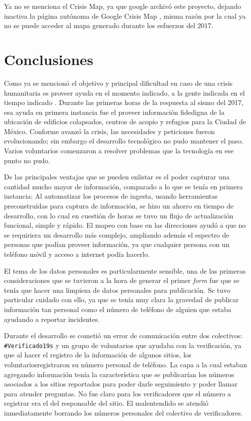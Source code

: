 \documentclass[12pt,spanish,oneside,breaklinks]{book}
\begin{document}
Ya no se menciona el Crisis Map, ya que google archivó este proyecto, dejando inactiva la página autónoma de Google Crisis Map \cite{googlecrisis}, misma razón por la cual ya no se puede acceder al mapa generado durante los esfuerzos del 2017.

\chapter{Conclusiones}
\label{sec:org4153bc4}

Como ya se mencionó el objetivo y principal dificultad en caso de una crisis humanitaria es proveer ayuda en el momento indicado, a la gente indicada en el tiempo indicado \cite{Aiko2014}. Durante las primeras horas de la respuesta al sismo del 2017, esa ayuda en primera instancia fue el proveer información fidedigna de la ubicación de edificios colapsados, centros de acopio y refugios para la Ciudad de México. Conforme avanzó la crisis, las necesidades y peticiones fueron evolucionando; sin embargo el desarrollo tecnológico no pudo mantener el paso. Varios voluntarios comenzaron a resolver problemas que la tecnología en ese punto no pudo.

De las principales ventajas que se pueden enlistar es el poder capturar una cantidad mucho mayor de información, comparado a lo que se tenía en primera instancia: Al automatizar los procesos de ingesta, usando herramientas preconstruídas para captura de información, se hizo un ahorro en tiempo de desarrollo, con lo cual en cuestión de horas se tuvo un flujo de actualización funcional, simple y rápido. El mapeo con base en las direcciones ayudó a que no se requiriera un desarrollo más complejo, ampliando además el espectro de personas que podían proveer información, ya que cualquier persona con un teléfono móvil y acceso a internet podía hacerlo.

El tema de los datos personales es particularmente sensible, una de las primeras consideraciones que se tuvieron a la hora de generar el primer \emph{form} fue que se tenía que hacer una limpieza de datos personales para publicación. Se tuvo particular cuidado con ello, ya que se tenía muy clara la gravedad de publicar información tan personal como el número de teléfono de alguien que estaba ayudando a reportar incidentes.

Durante el desarrollo se cometió un error de comunicación entre dos colectivos: \texttt{\#Verificado19s} y un grupo de voluntarios que ayudaba con la verificación, ya que al hacer el registro de la información de algunos sitios, los voluntariosregistraron su número personal de teléfono. La capa a la cual estaban agregando información tenía la característica que se publicarían los números asociados a los sitios reportados  para poder darle seguimiento y poder llamar para atender preguntas. No fue claro para los verificadores que el número a registrar era el del responsable del sitio. El malentendido se atendió inmediatamente borrando los números personales del colectivo de verificadores.
\end{document}
